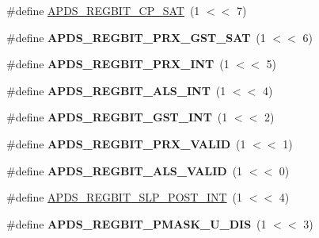 \begin{DoxyCompactItemize}
\#define \hyperlink{group__APDS9960__FunctionDefines_gaf520aa8e07235bdf24c608b5fc56ba02}{A\+P\+D\+S\+\_\+\+R\+E\+G\+B\+I\+T\+\_\+\+C\+P\+\_\+\+S\+AT}~(1 $<$$<$ 7)
\item 
\mbox{\label{group__APDS9960__FunctionDefines_gaf78055329c6c5a084094a28fffb300a3}} 
\#define {\bfseries A\+P\+D\+S\+\_\+\+R\+E\+G\+B\+I\+T\+\_\+\+P\+R\+X\+\_\+\+G\+S\+T\+\_\+\+S\+AT}~(1 $<$$<$ 6)
\item 
\mbox{\label{group__APDS9960__FunctionDefines_ga178c1bb50f35383f2f118dcb375f4f5d}} 
\#define {\bfseries A\+P\+D\+S\+\_\+\+R\+E\+G\+B\+I\+T\+\_\+\+P\+R\+X\+\_\+\+I\+NT}~(1 $<$$<$ 5)
\item 
\mbox{\label{group__APDS9960__FunctionDefines_ga9ae405e3e32b981292d722618c72e81e}} 
\#define {\bfseries A\+P\+D\+S\+\_\+\+R\+E\+G\+B\+I\+T\+\_\+\+A\+L\+S\+\_\+\+I\+NT}~(1 $<$$<$ 4)
\item 
\mbox{\label{group__APDS9960__FunctionDefines_ga1f0f74ffd70af761fbf72eab2d82f573}} 
\#define {\bfseries A\+P\+D\+S\+\_\+\+R\+E\+G\+B\+I\+T\+\_\+\+G\+S\+T\+\_\+\+I\+NT}~(1 $<$$<$ 2)
\item 
\mbox{\label{group__APDS9960__FunctionDefines_ga9c81bb55072c38ad6f54fcfaefb7dd9c}} 
\#define {\bfseries A\+P\+D\+S\+\_\+\+R\+E\+G\+B\+I\+T\+\_\+\+P\+R\+X\+\_\+\+V\+A\+L\+ID}~(1 $<$$<$ 1)
\item 
\mbox{\label{group__APDS9960__FunctionDefines_ga0e04615fd7b4730239065a3fc4f0a8dc}} 
\#define {\bfseries A\+P\+D\+S\+\_\+\+R\+E\+G\+B\+I\+T\+\_\+\+A\+L\+S\+\_\+\+V\+A\+L\+ID}~(1 $<$$<$ 0)
\item 
\#define \hyperlink{group__APDS9960__FunctionDefines_ga1f62be501a8ac98fd03058edb9dc305e}{A\+P\+D\+S\+\_\+\+R\+E\+G\+B\+I\+T\+\_\+\+S\+L\+P\+\_\+\+P\+O\+S\+T\+\_\+\+I\+NT}~(1 $<$$<$ 4)
\item 
\mbox{\label{group__APDS9960__FunctionDefines_ga075a917bc16dd1e824428007db774173}} 
\#define {\bfseries A\+P\+D\+S\+\_\+\+R\+E\+G\+B\+I\+T\+\_\+\+P\+M\+A\+S\+K\+\_\+\+U\+\_\+\+D\+IS}~(1 $<$$<$ 3)
\item 
$$
\end{DoxyCompactItemize}
